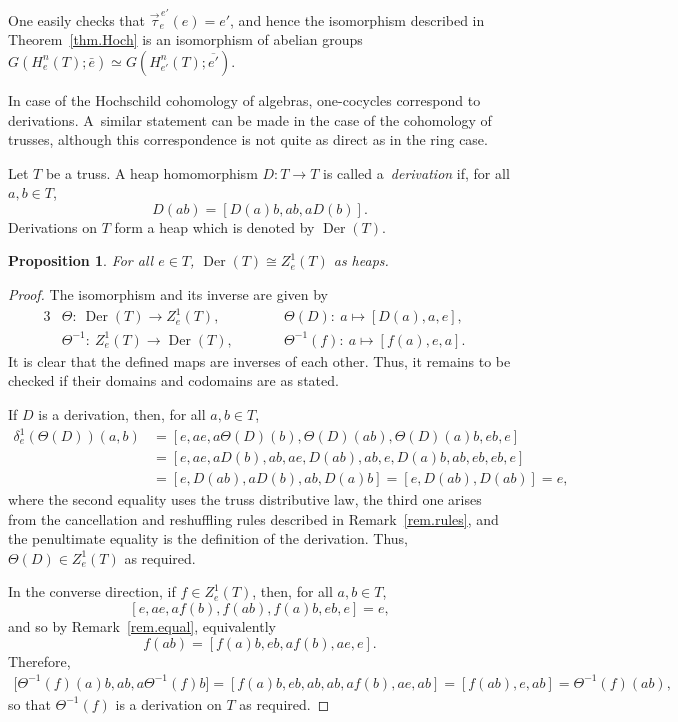 \documentclass[10pt,a4paper]{amsart}
\numberwithin{equation}{section}
\newtheorem{Proposition}[Theorem]{Proposition}
 { \theoremstyle{definition}
\newtheorem{Definition}[Theorem]{Definition}
\newtheorem{Note}[Theorem]{Note}
\newtheorem{Example}[Theorem]{Example}
\newtheorem{Remark}[Theorem]{Remark}}
\begin{document}
\begin{Remark}\label{rem.iso.gr}
 One easily checks that $\vec{\tau}_e^{\,e'}(e) =e'$, and hence the isomorphism described in Theorem~\ref{thm.Hoch} is an isomorphism of abelian groups $G(H^n_e(T);\bar{e})\simeq G(H^n_{e'}(T); \overline{e'})$.
\end{Remark}

In case of the Hochschild cohomology of algebras, one-cocycles correspond to derivations. A~similar statement can be made in the case of the cohomology of trusses, although this correspondence is not quite as direct as in the ring case.

\begin{Definition}
 Let $T$ be a truss. A heap homomorphism $D\colon T\to T$ is called a~\textit{derivation} if, for all $a,b\in T$,
 \[
 D(ab) = [D(a)b, ab, aD(b)].
 \]
 Derivations on $T$ form a heap which is denoted by $\operatorname{Der}(T)$.
\end{Definition}

\begin{Proposition}
 For all $e\in T$, $\operatorname{Der}(T)\cong Z_e^1(T)$ as heaps.
\end{Proposition}
\begin{proof}
 The isomorphism and its inverse are given by
 \begin{alignat*}{3}%
 &\Theta\colon\ \operatorname{Der}(T)\to Z^1_e(T),\qquad && \Theta(D)\colon\ a\mapsto [D(a),a,e],&
 \\
 & \Theta^{-1}\colon\ Z^1_e(T) \to \operatorname{Der}(T), \qquad&& \Theta^{-1}(f)\colon\ a\mapsto [f(a),e,a].&
 \end{alignat*}
It is clear that the defined maps are inverses of each other. Thus, it remains to be checked if their domains and codomains are as stated.

If $D$ is a derivation, then, for all $a,b\in T$,
\begin{align*}
 \delta_e^1(\Theta(D))(a,b) &= [e,ae,a\Theta(D)(b), \Theta(D)(ab), \Theta(D)(a)b, eb, e]\\
 &= [e,ae,aD(b),ab,ae, D(ab), ab,e,D(a)b, ab, eb,eb,e]\\
 &=[e,D(ab), aD(b),ab, D(a)b] = [e,D(ab), D(ab)] =e,
\end{align*}
where the second equality uses the truss distributive law, the third one arises from the cancellation and reshuffling rules described in Remark~\ref{rem.rules}, and the penultimate equality is the definition of the derivation. Thus, $\Theta(D) \in Z_e^1(T)$ as required.

In the converse direction, if $f\in Z_e^1(T)$, then, for all $a,b\in T$,
\[
[e, ae, af(b), f(ab), f(a)b, eb, e]= e,
\]
and so by Remark~\ref{rem.equal}, equivalently
\[
f(ab) = [f(a)b, eb, af(b),ae, e].
\]
Therefore,
\begin{align*}
 \big[\Theta^{-1}(f)(a)b,ab,a\Theta^{-1}(f)b\big] = [f(a)b,eb,ab,ab,af(b),ae,ab]= [f(ab),e,ab] = \Theta^{-1}(f)(ab),
\end{align*}
so that $\Theta^{-1}(f)$ is a derivation on $T$ as required.
\end{proof}
\end{document}
